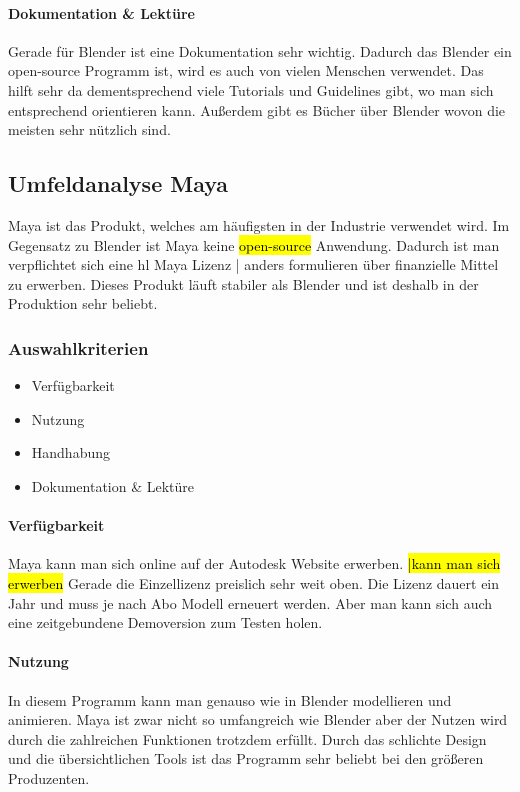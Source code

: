 \paragraph{Dokumentation \& Lektüre}
Gerade für Blender ist eine Dokumentation sehr wichtig. Dadurch das Blender ein open-source Programm ist, wird es auch von vielen Menschen verwendet. Das hilft sehr da dementsprechend viele Tutorials und Guidelines gibt, wo man sich entsprechend orientieren kann. Außerdem gibt es Bücher über Blender wovon die meisten sehr nützlich sind.

\pagebreak

\subsection{Umfeldanalyse Maya}
Maya ist das Produkt, welches am häufigsten in der Industrie verwendet wird. Im Gegensatz zu Blender ist Maya keine \hl{open-source} Anwendung. Dadurch ist man verpflichtet sich eine hl  {Maya Lizenz | anders formulieren} über finanzielle Mittel zu erwerben. Dieses Produkt läuft stabiler als Blender und ist deshalb in der Produktion sehr beliebt.

\subsubsection{Auswahlkriterien}
\begin{itemize}
    \item Verfügbarkeit
    \item Nutzung
    \item Handhabung
    \item Dokumentation \& Lektüre
\end{itemize}

\paragraph{Verfügbarkeit}
Maya kann man sich online auf der Autodesk Website erwerben. \hl{|kann man sich erwerben} Gerade die Einzellizenz preislich sehr weit oben. Die Lizenz dauert ein Jahr und muss je nach Abo Modell erneuert werden. Aber man kann sich auch eine zeitgebundene Demoversion zum Testen holen.

\paragraph{Nutzung}
In diesem Programm kann man genauso wie in Blender modellieren und animieren. Maya ist zwar nicht so umfangreich wie Blender aber der Nutzen wird durch die zahlreichen Funktionen trotzdem erfüllt. Durch das schlichte Design und die übersichtlichen Tools ist das Programm sehr beliebt bei den größeren Produzenten.

